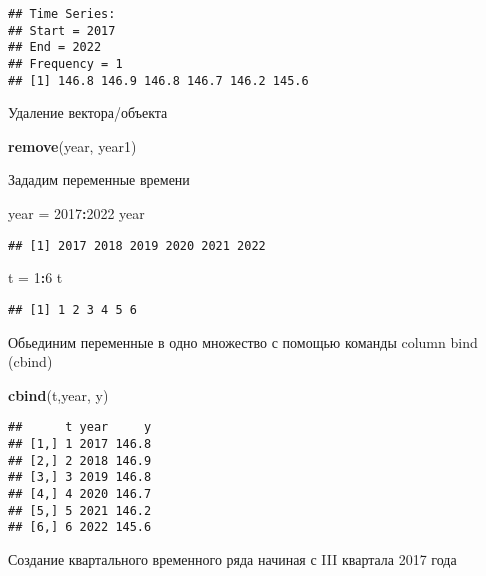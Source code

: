 \documentclass[
]{article}
\newenvironment{Shaded}{\begin{snugshade}}{\end{snugshade}}
\newcommand{\DecValTok}[1]{\textcolor[rgb]{0.00,0.00,0.81}{#1}}
\newcommand{\FunctionTok}[1]{\textcolor[rgb]{0.13,0.29,0.53}{\textbf{#1}}}
\newcommand{\NormalTok}[1]{#1}
\newcommand{\OtherTok}[1]{\textcolor[rgb]{0.56,0.35,0.01}{#1}}
\newcommand{\SpecialCharTok}[1]{\textcolor[rgb]{0.81,0.36,0.00}{\textbf{#1}}}
\begin{document}
\begin{verbatim}
## Time Series:
## Start = 2017 
## End = 2022 
## Frequency = 1 
## [1] 146.8 146.9 146.8 146.7 146.2 145.6
\end{verbatim}

Удаление вектора/объекта

\begin{Shaded}
\begin{Highlighting}[]
\FunctionTok{remove}\NormalTok{(year, year1)}
\end{Highlighting}
\end{Shaded}

Зададим переменные времени

\begin{Shaded}
\begin{Highlighting}[]
\NormalTok{year }\OtherTok{=} \DecValTok{2017}\SpecialCharTok{:}\DecValTok{2022}
\NormalTok{year}
\end{Highlighting}
\end{Shaded}

\begin{verbatim}
## [1] 2017 2018 2019 2020 2021 2022
\end{verbatim}

\begin{Shaded}
\begin{Highlighting}[]
\NormalTok{t }\OtherTok{=} \DecValTok{1}\SpecialCharTok{:}\DecValTok{6}
\NormalTok{t}
\end{Highlighting}
\end{Shaded}

\begin{verbatim}
## [1] 1 2 3 4 5 6
\end{verbatim}

Обьединим переменные в одно множество с помощью команды column bind
(cbind)

\begin{Shaded}
\begin{Highlighting}[]
\FunctionTok{cbind}\NormalTok{(t,year, y)}
\end{Highlighting}
\end{Shaded}

\begin{verbatim}
##      t year     y
## [1,] 1 2017 146.8
## [2,] 2 2018 146.9
## [3,] 3 2019 146.8
## [4,] 4 2020 146.7
## [5,] 5 2021 146.2
## [6,] 6 2022 145.6
\end{verbatim}

Создание квартального временного ряда начиная с III квартала 2017 года
\end{document}
